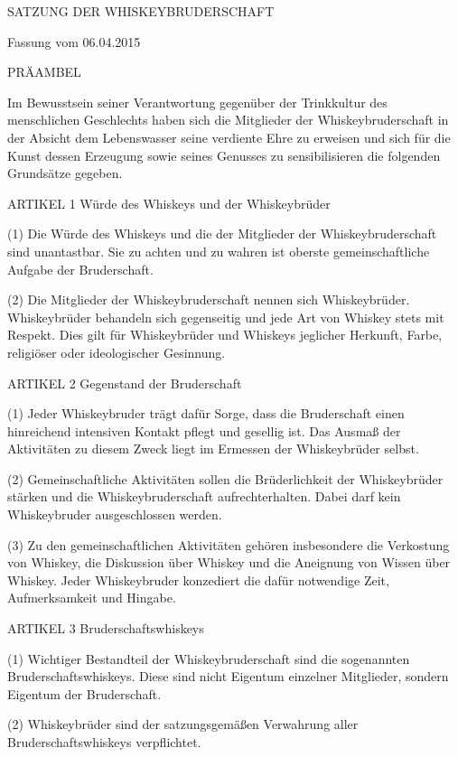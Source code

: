 SATZUNG DER WHISKEYBRUDERSCHAFT

Fassung vom 06.04.2015



    PRÄAMBEL

Im Bewusstsein seiner Verantwortung gegenüber der Trinkkultur des menschlichen Geschlechts haben sich die Mitglieder der Whiskeybruderschaft in der Absicht dem Lebenswasser seine verdiente Ehre zu erweisen und sich für die Kunst dessen Erzeugung sowie seines Genusses zu sensibilisieren die folgenden Grundsätze gegeben.



    ARTIKEL 1
    Würde des Whiskeys und der Whiskeybrüder

(1) Die Würde des Whiskeys und die der Mitglieder der Whiskeybruderschaft sind unantastbar. Sie zu achten und zu wahren ist oberste gemeinschaftliche Aufgabe der Bruderschaft.

(2) Die Mitglieder der Whiskeybruderschaft nennen sich Whiskeybrüder. Whiskeybrüder behandeln sich gegenseitig und jede Art von Whiskey stets mit Respekt. Dies gilt für Whiskeybrüder und Whiskeys jeglicher Herkunft, Farbe, religiöser oder ideologischer Gesinnung.



    ARTIKEL 2
    Gegenstand der Bruderschaft

(1) Jeder Whiskeybruder trägt dafür Sorge, dass die Bruderschaft einen hinreichend intensiven Kontakt pflegt und gesellig ist. Das Ausmaß der Aktivitäten zu diesem Zweck liegt im Ermessen der Whiskeybrüder selbst.

(2) Gemeinschaftliche Aktivitäten sollen die Brüderlichkeit der Whiskeybrüder stärken und die Whiskeybruderschaft aufrechterhalten. Dabei darf kein Whiskeybruder ausgeschlossen werden.

(3) Zu den gemeinschaftlichen Aktivitäten gehören insbesondere die Verkostung von Whiskey, die Diskussion über Whiskey und die Aneignung von Wissen über Whiskey. Jeder Whiskeybruder konzediert die dafür notwendige Zeit, Aufmerksamkeit und Hingabe.



    ARTIKEL 3
    Bruderschaftswhiskeys

(1) Wichtiger Bestandteil der Whiskeybruderschaft sind die sogenannten Bruderschaftswhiskeys. Diese sind nicht Eigentum einzelner Mitglieder, sondern Eigentum der Bruderschaft.

(2) Whiskeybrüder sind der satzungsgemäßen Verwahrung aller Bruderschaftswhiskeys verpflichtet.

